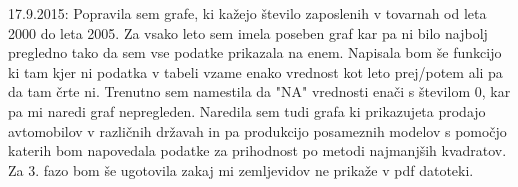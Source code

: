 \documentclass[11pt,a4paper]{article}
\begin{document}
17.9.2015: Popravila sem grafe, ki kažejo število zaposlenih v tovarnah od leta 2000 do leta 2005. Za vsako leto sem imela poseben graf kar pa ni bilo najbolj pregledno tako da sem vse podatke prikazala na enem. Napisala bom še funkcijo ki tam kjer ni podatka v tabeli vzame enako vrednost kot leto prej/potem ali pa da tam črte ni. Trenutno sem namestila da "NA" vrednosti enači s številom 0, kar pa mi naredi graf nepregleden. Naredila sem tudi grafa ki prikazujeta prodajo avtomobilov v različnih državah in pa produkcijo posameznih modelov s pomočjo katerih bom napovedala podatke za prihodnost po metodi najmanjših kvadratov. Za 3. fazo bom še ugotovila zakaj mi zemljevidov ne prikaže v pdf datoteki.

\end{document}

